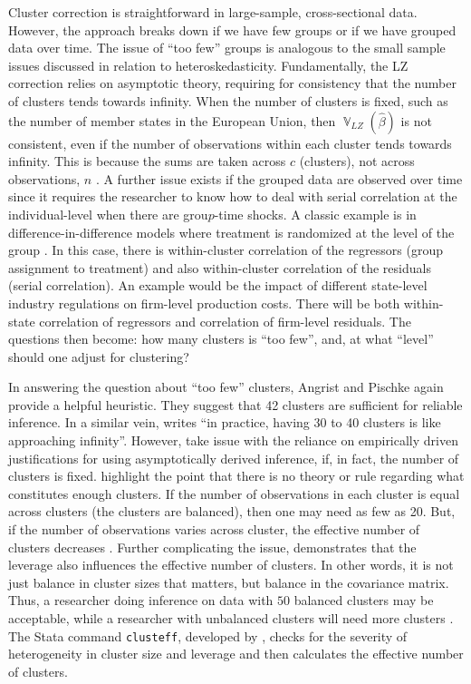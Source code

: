 \documentclass[11pt]{article}
\DeclareMathOperator{\V}{\mathbb{V}}
\begin{document}
Cluster correction is straightforward in large-sample, cross-sectional data. However, the approach breaks down if we have few groups or if we have grouped data over time. The issue of ``too few'' groups is analogous to the small sample issues discussed in relation to heteroskedasticity. Fundamentally, the LZ correction relies on asymptotic theory, requiring for consistency that the number of clusters tends towards infinity. When the number of clusters is fixed, such as the number of member states in the European Union, then $\V_{LZ} \left( \hat{\beta} \right)$ is not consistent, even if the number of observations within each cluster tends towards infinity. This is because the sums are taken across $c$ (clusters), not across observations, $n$ \citep{angrist_mostly_2009}. A further issue exists if the grouped data are observed over time since it requires the researcher to know how to deal with serial correlation at the individual-level when there are grou$p$-time shocks. A classic example is in difference-in-difference models where treatment is randomized at the level of the group \citep{bertrand_how_2004, cameron_practitioners_2015}. In this case, there is within-cluster correlation of the regressors (group assignment to treatment) and also within-cluster correlation of the residuals (serial correlation). An example would be the impact of different state-level industry regulations on firm-level production costs. There will be both within-state correlation of regressors and correlation of firm-level residuals. The questions then become: how many clusters is ``too few'', and, at what ``level'' should one adjust for clustering?

In answering the question about ``too few'' clusters, Angrist and Pischke again provide a helpful heuristic. They suggest that 42 clusters are sufficient for reliable inference. In a similar vein, \cite{ozler_beware_2012} writes ``in practice, having 30 to 40 clusters is like approaching infinity''. However, \cite{abadie_when_2017} take issue with the reliance on empirically driven justifications for using asymptotically derived inference, if, in fact, the number of clusters is fixed. \cite{cameron_practitioners_2015} highlight the point that there is no theory or rule regarding what constitutes enough clusters. If the number of observations in each cluster is equal across clusters (the clusters are balanced), then one may need as few as 20. But, if the number of observations varies across cluster, the effective number of clusters decreases \citep{imbens_robust_2016}. Further complicating the issue, \cite{young_improved_2016} demonstrates that the leverage also influences the effective number of clusters. In other words, it is not just balance in cluster sizes that matters, but balance in the covariance matrix. Thus, a researcher doing inference on data with $50$ balanced clusters may be acceptable, while a researcher with unbalanced clusters will need more clusters \citep{carter_asymptotic_2017}. The Stata command \texttt{clusteff}, developed by \cite{lee_multiple_2014}, checks for the severity of heterogeneity in cluster size and leverage and then calculates the effective number of clusters.
\end{document}
